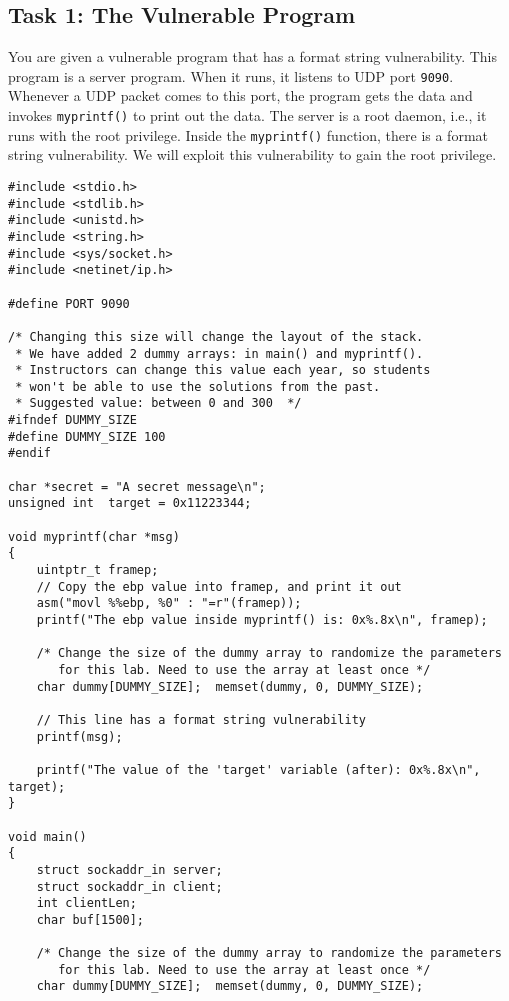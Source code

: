 \subsection{Task 1: The Vulnerable Program}

You are given a vulnerable program that has a format string vulnerability.
This program is a server program. When it runs, it listens to UDP port
\texttt{9090}. Whenever a UDP packet comes to this port, the program
gets the data and invokes \texttt{myprintf()} to print out the data. 
The server is a root daemon, i.e., it runs with the root privilege. 
Inside the \texttt{myprintf()} function, there is a format string
vulnerability. We will exploit this vulnerability to gain the root
privilege.  

\begin{lstlisting}[label=format:code:server, caption={The vulnerable server program
             \texttt{server.c} (can be downloaded from the lab's website)}]
#include <stdio.h>
#include <stdlib.h>
#include <unistd.h>
#include <string.h>
#include <sys/socket.h>
#include <netinet/ip.h>

#define PORT 9090

/* Changing this size will change the layout of the stack.
 * We have added 2 dummy arrays: in main() and myprintf().
 * Instructors can change this value each year, so students
 * won't be able to use the solutions from the past.
 * Suggested value: between 0 and 300  */
#ifndef DUMMY_SIZE
#define DUMMY_SIZE 100
#endif

char *secret = "A secret message\n";
unsigned int  target = 0x11223344;

void myprintf(char *msg)
{
    uintptr_t framep;
    // Copy the ebp value into framep, and print it out
    asm("movl %%ebp, %0" : "=r"(framep));
    printf("The ebp value inside myprintf() is: 0x%.8x\n", framep);

    /* Change the size of the dummy array to randomize the parameters
       for this lab. Need to use the array at least once */
    char dummy[DUMMY_SIZE];  memset(dummy, 0, DUMMY_SIZE);

    // This line has a format string vulnerability
    printf(msg);

    printf("The value of the 'target' variable (after): 0x%.8x\n", target);
}

void main()
{
    struct sockaddr_in server;
    struct sockaddr_in client;
    int clientLen;
    char buf[1500];

    /* Change the size of the dummy array to randomize the parameters
       for this lab. Need to use the array at least once */
    char dummy[DUMMY_SIZE];  memset(dummy, 0, DUMMY_SIZE);


\end{lstlisting}
